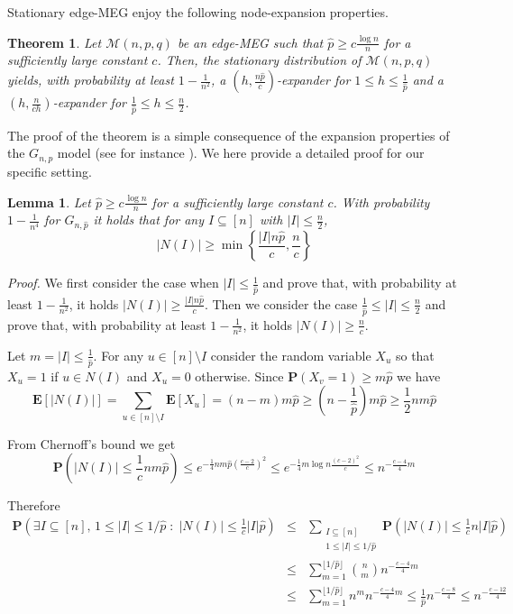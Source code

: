 \documentclass[10pt,a4paper]{article}
\newtheorem{lemma}[definition]{Lemma}
\newtheorem{theorem}[definition]{Theorem}
\newcommand{\Prob}[1]{\mathbf{P} \left( #1 \right)}
\newcommand{\Expec}[1]{\mathbf{E} \left[ #1 \right]}
\newcommand{\proof}{\noindent\textit{Proof. }}
\begin{document}
\noindent Stationary edge-MEG enjoy the following node-expansion properties.

\begin{theorem}\label{Marco} Let  $\mathcal{M}(n,p,q)$  be an edge-MEG such that $ \hat{p} \geqslant c \frac{\log n}{n} $ for a sufficiently large constant $c$. Then, the stationary distribution of $\mathcal{M}(n,p,q)$  yields, with probability at least $1-\frac{1}{n^2}$, a $\left(h, \frac{n\hat{p}}{c}\right)$-expander for  $1\leqslant h\leqslant \frac{1}{\hat{p}}$ and a $\left(h,\frac{n}{ch}\right)$-expander for  $\frac{1}{\hat{p}}\leqslant h\leqslant \frac{n}{2}$.
\end{theorem}

\noindent The proof of the  theorem is a simple consequence of the expansion properties of the $G_{n,p}$ model (see for instance \cite{CF07}). We here provide a detailed proof for our specific setting.

\begin{lemma}\label{lvicinignp}
Let $\hat{p} \geqslant c \frac{\log n}{n}$ for a sufficiently large constant $c$. With probability $1-\frac{1}{n^4}$ for $G_{n,\hat{p}}$ it holds that for any $I\subseteq [n]$ with $|I| \leqslant
\frac{n}{2}$,
$$
|N(I)|\geqslant \min\left\{\frac{|I|n\hat{p}}{c}, \frac{n}{c}\right\}
$$
\end{lemma}
\proof
We first consider the case when $|I|\leqslant \frac{1}{\hat{p}}$ and prove that, with probability at least $1-\frac{1}{n^2}$, it holds  $|N(I)|\geqslant \frac{|I|n\hat{p}}{c}$. Then we consider the case $\frac{1}{\hat{p}}\leqslant |I|\leqslant \frac{n}{2}$ and prove that, with probability at least $1-\frac{1}{n^2}$, it holds $|N(I)|\geqslant \frac{n}{c}$.

\noindent Let $m=|I|\leqslant \frac{1}{\hat{p}}$. For any $u\in[n]\setminus I$ consider the random variable $X_u$ so that $X_u=1$ if $u\in N(I)$ and $X_u=0$ otherwise. Since $\Prob{X_v = 1} \geqslant m\hat{p}$ we have
$$
\Expec{|N(I)|}  =  \sum_{u \in[n] \setminus I} \Expec{X_u}
= (n-m)m\hat{p}
\geqslant \left( n - \frac{1}{\hat{p}} \right) m \hat{p}
\geqslant \frac{1}{2} n m \hat{p}
$$

\noindent From Chernoff's bound we get
$$
\Prob{|N(I)| \leqslant \frac{1}{c} nm\hat{p} } \leqslant e^{-\frac{1}{4}
nm\hat{p}\left(\frac{c-2}{c}\right)^2}
\leqslant  e^{-\frac{1}{4} m \log n\frac{(c-2)^2}{c}}
\leqslant n^{-\frac{c-4}{4} m}
$$

\noindent Therefore
\begin{eqnarray*}
\Prob{\exists I \subseteq [n], \, 1 \leqslant |I| \leqslant 1/\hat{p} \;:\; |N(I)| \leqslant \frac{1}{c} |I|\hat{p}}
& \leqslant & \sum_{\begin{array}{c} I \subseteq [n] \\ 1 \leqslant |I| \leqslant 1/\hat{p} \end{array}} \Prob{|N(I)| \leqslant \frac{1}{c} n|I|\hat{p}} \\
& \leqslant &  \sum_{m=1}^{\lfloor 1/\hat{p} \rfloor} \binom{n}{m} n^{-\frac{c-4}{4} m}\\
& \leqslant & \sum_{m=1}^{\lfloor 1/\hat{p} \rfloor} n^m n^{-\frac{c-4}{4} m} \leqslant \frac{1}{\hat{p}} n^{-\frac{c-8}{4} } \leqslant n^{-\frac{c-12}{4}}
\end{eqnarray*}
\end{document}
